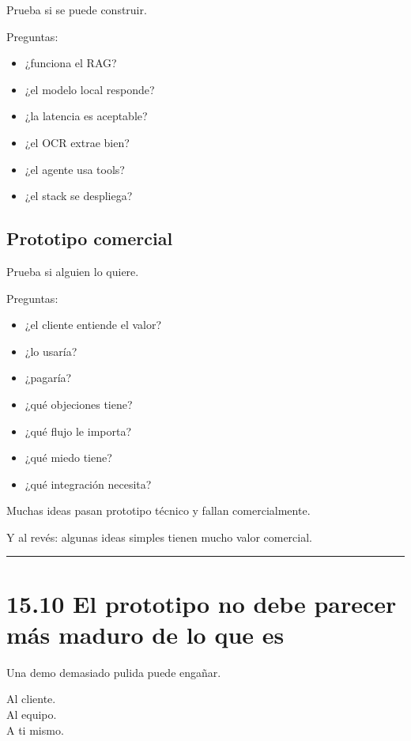Prueba si se puede construir.

Preguntas:

\begin{itemize}
\tightlist
\item
  ¿funciona el RAG?
\item
  ¿el modelo local responde?
\item
  ¿la latencia es aceptable?
\item
  ¿el OCR extrae bien?
\item
  ¿el agente usa tools?
\item
  ¿el stack se despliega?
\end{itemize}

\subsection{Prototipo comercial}\label{prototipo-comercial}

Prueba si alguien lo quiere.

Preguntas:

\begin{itemize}
\tightlist
\item
  ¿el cliente entiende el valor?
\item
  ¿lo usaría?
\item
  ¿pagaría?
\item
  ¿qué objeciones tiene?
\item
  ¿qué flujo le importa?
\item
  ¿qué miedo tiene?
\item
  ¿qué integración necesita?
\end{itemize}

Muchas ideas pasan prototipo técnico y fallan comercialmente.

Y al revés: algunas ideas simples tienen mucho valor comercial.

\begin{center}\rule{0.5\linewidth}{0.5pt}\end{center}

\section{15.10 El prototipo no debe parecer más maduro de lo que
es}\label{el-prototipo-no-debe-parecer-muxe1s-maduro-de-lo-que-es}

Una demo demasiado pulida puede engañar.

Al cliente.\\
Al equipo.\\
A ti mismo.


